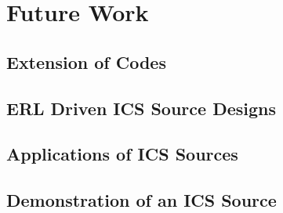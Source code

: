 \documentclass[../main.tex]{subfiles}
\begin{document}
\section{Future Work}

\subsection{Extension of Codes}

\subsection{ERL Driven ICS Source Designs}

\subsection{Applications of ICS Sources}

\subsection{Demonstration of an ICS Source}
\end{document}
